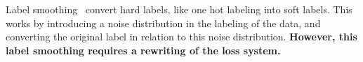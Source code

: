 Label smoothing~\cite{labelSmooth} convert hard labels, like one hot labeling into soft labels. This works by introducing a noise distribution in the labeling of the data, and converting the original label in relation to this noise distribution. \textbf{However, this label smoothing requires a rewriting of the loss system.}


